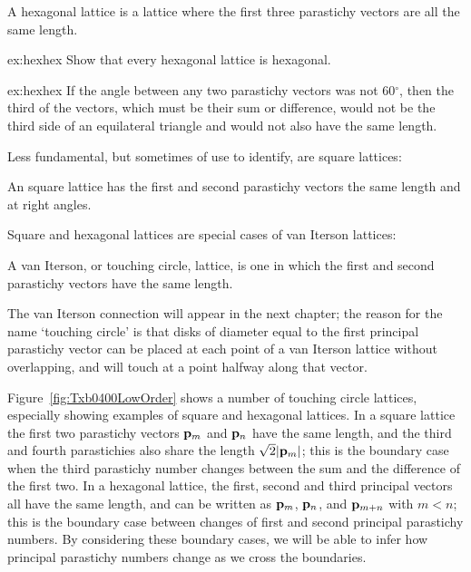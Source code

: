 \begin{definition}
	A hexagonal lattice is a lattice where the first three parastichy vectors are all the same length. 
\end{definition}
\begin{jExercise}{ex:hexhex}
	Show that every hexagonal lattice is hexagonal.
\end{jExercise}
\begin{jAnswer}{ex:hexhex}
	If the angle between any two parastichy vectors was not 60$^\circ$, then the third of the vectors, which must be their sum or difference, would not be the third side of an equilateral triangle and would not also have the same length.
\end{jAnswer}
Less fundamental, but sometimes of use to identify, are square lattices:
\begin{definition}
	An square lattice has the first and second parastichy vectors the same length and at right angles. 
\end{definition}
Square and hexagonal lattices are special cases of van Iterson lattices:
\begin{definition}
	A van Iterson, or touching circle, lattice, is one in which the first and second parastichy vectors have the same length.
\end{definition}
\clearpage
The van Iterson connection will appear in the next chapter; the reason for the name `touching circle' is that disks of diameter equal to the first principal parastichy vector can be placed at each point of a van Iterson lattice without overlapping, and will touch at a point halfway along that vector. 


Figure~\ref{fig:Txb0400LowOrder} shows a number of touching circle lattices, especially showing examples of square and hexagonal lattices. 
%
In a square lattice the first two parastichy vectors ${\mathbf p}_{m}$ and ${\mathbf p}_{n}$ have the same length, and the third and fourth parastichies also share the length $\sqrt{2}|{\mathbf p}_{m}|$; this is the boundary case when the third parastichy number changes between the sum and the difference of the first two. In a hexagonal lattice, the  first,  second and third principal  vectors all have the same length, and can be written as ${\mathbf p}_{m}$, ${\mathbf p}_{n}$, and ${\mathbf p}_{m+n}$ with $m<n$; this is the boundary case between changes of first and second principal parastichy numbers. 
By considering these boundary cases, we will be able to  infer how principal parastichy numbers change as we cross the boundaries.  



